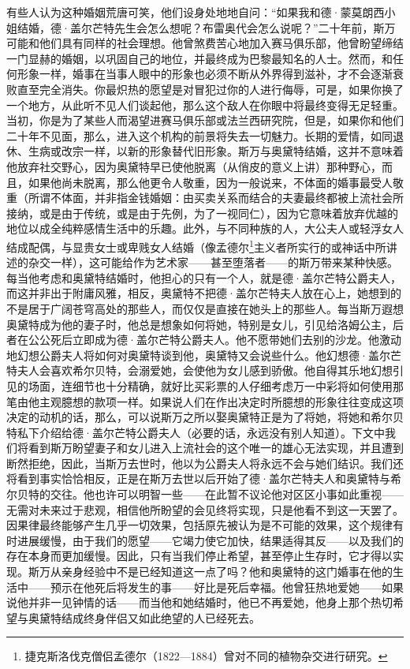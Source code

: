 \par 有些人认为这种婚姻荒唐可笑，他们设身处地地自问：“如果我和德·蒙莫朗西小姐结婚，德·盖尔芒特先生会怎么想呢？布雷奥代会怎么说呢？”二十年前，斯万可能和他们具有同样的社会理想。他曾煞费苦心地加入赛马俱乐部，他曾盼望缔结一门显赫的婚姻，以巩固自己的地位，并最终成为巴黎最知名的人士。然而，和任何形象一样，婚事在当事人眼中的形象也必须不断从外界得到滋补，才不会逐渐衰败直至完全消失。你最炽热的愿望是对冒犯过你的人进行侮辱，可是，如果你换了一个地方，从此听不见人们谈起他，那么这个敌人在你眼中将最终变得无足轻重。当初，你是为了某些人而渴望进赛马俱乐部或法兰西研究院，但是，如果你和他们二十年不见面，那么，进入这个机构的前景将失去一切魅力。长期的爱情，如同退休、生病或改宗一样，以新的形象替代旧形象。斯万与奥黛特结婚，这并不意味着他放弃社交野心，因为奥黛特早已使他脱离（从俏皮的意义上讲）那种野心，而且，如果他尚未脱离，那么他更令人敬重，因为一般说来，不体面的婚事最受人敬重（所谓不体面，并非指金钱婚姻：由买卖关系而结合的夫妻最终都被上流社会所接纳，或是由于传统，或是由于先例，为了一视同仁），因为它意味着放弃优越的地位以成全纯粹感情生活中的乐趣。此外，与不同种族的人，大公夫人或轻浮女人结成配偶，与显贵女士或卑贱女人结婚（像孟德尔\footnote{捷克斯洛伐克僧侣孟德尔（1822—1884）曾对不同的植物杂交进行研究。}主义者所实行的或神话中所讲述的杂交一样），这可能给作为艺术家——甚至堕落者——的斯万带来某种快感。每当他考虑和奥黛特结婚时，他担心的只有一个人，就是德·盖尔芒特公爵夫人，而这并非出于附庸风雅，相反，奥黛特不把德·盖尔芒特夫人放在心上，她想到的不是居于广阔苍穹高处的那些人，而仅仅是直接在她头上的那些人。每当斯万遐想奥黛特成为他的妻子时，他总是想象如何将她，特别是女儿，引见给洛姆公主，后者在公公死后立即成为德·盖尔芒特公爵夫人。他不愿带她们去别的沙龙。他激动地幻想公爵夫人将如何对奥黛特谈到他，奥黛特又会说些什么。他幻想德·盖尔芒特夫人会喜欢希尔贝特，会溺爱她，会使他为女儿感到骄傲。他自得其乐地幻想引见的场面，连细节也十分精确，就好比买彩票的人仔细考虑万一中彩将如何使用那笔由他主观臆想的款项一样。如果说人们在作出决定时所臆想的形象往往变成这项决定的动机的话，那么，可以说斯万之所以娶奥黛特正是为了将她，将她和希尔贝特私下介绍给德·盖尔芒特公爵夫人（必要的话，永远没有别人知道）。下文中我们将看到斯万盼望妻子和女儿进入上流社会的这个唯一的雄心无法实现，并且遭到断然拒绝，因此，当斯万去世时，他以为公爵夫人将永远不会与她们结识。我们还将看到事实恰恰相反，正是在斯万去世以后开始了德·盖尔芒特夫人和奥黛特与希尔贝特的交往。他也许可以明智一些——在此暂不议论他对区区小事如此重视——无需对未来过于悲观，相信他所盼望的会见终将实现，只是他看不到这一天罢了。因果律最终能够产生几乎一切效果，包括原先被认为是不可能的效果，这个规律有时进展缓慢，由于我们的愿望——它竭力使它加快，结果适得其反——以及我们的存在本身而更加缓慢。因此，只有当我们停止希望，甚至停止生存时，它才得以实现。斯万从亲身经验中不是已经知道这一点了吗？他和奥黛特的这门婚事在他的生活中——预示在他死后将发生的事——好比是死后幸福。他曾狂热地爱她——如果说他并非一见钟情的话——而当他和她结婚时，他已不再爱她，他身上那个热切希望与奥黛特结成终身伴侣又如此绝望的人已经死去。
